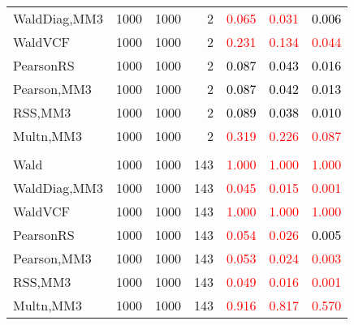 \documentclass[
]{article}
\begin{document}
\begin{table}[H]
{\begin{tabular}[t]{lrrrrrr}
\hspace{1em}WaldDiag,MM3 & 1000 & 1000 & 2 & \textcolor{red}{0.065} & \textcolor{red}{0.031} & \textcolor{black}{0.006}\\
\hspace{1em}WaldVCF & 1000 & 1000 & 2 & \textcolor{red}{0.231} & \textcolor{red}{0.134} & \textcolor{red}{0.044}\\
\hspace{1em}PearsonRS & 1000 & 1000 & 2 & \textcolor{black}{0.087} & \textcolor{black}{0.043} & \textcolor{black}{0.016}\\
\hspace{1em}Pearson,MM3 & 1000 & 1000 & 2 & \textcolor{black}{0.087} & \textcolor{black}{0.042} & \textcolor{black}{0.013}\\
\hspace{1em}RSS,MM3 & 1000 & 1000 & 2 & \textcolor{black}{0.089} & \textcolor{black}{0.038} & \textcolor{black}{0.010}\\
\hspace{1em}Multn,MM3 & 1000 & 1000 & 2 & \textcolor{red}{0.319} & \textcolor{red}{0.226} & \textcolor{red}{0.087}\\
\addlinespace[0.3em]
\multicolumn{7}{l}{\textbf{1F 15V}}\\
\hspace{1em}Wald & 1000 & 1000 & 143 & \textcolor{red}{1.000} & \textcolor{red}{1.000} & \textcolor{red}{1.000}\\
\hspace{1em}WaldDiag,MM3 & 1000 & 1000 & 143 & \textcolor{red}{0.045} & \textcolor{red}{0.015} & \textcolor{red}{0.001}\\
\hspace{1em}WaldVCF & 1000 & 1000 & 143 & \textcolor{red}{1.000} & \textcolor{red}{1.000} & \textcolor{red}{1.000}\\
\hspace{1em}PearsonRS & 1000 & 1000 & 143 & \textcolor{red}{0.054} & \textcolor{red}{0.026} & \textcolor{black}{0.005}\\
\hspace{1em}Pearson,MM3 & 1000 & 1000 & 143 & \textcolor{red}{0.053} & \textcolor{red}{0.024} & \textcolor{red}{0.003}\\
\hspace{1em}RSS,MM3 & 1000 & 1000 & 143 & \textcolor{red}{0.049} & \textcolor{red}{0.016} & \textcolor{red}{0.001}\\
\hspace{1em}Multn,MM3 & 1000 & 1000 & 143 & \textcolor{red}{0.916} & \textcolor{red}{0.817} & \textcolor{red}{0.570}\\

\end{tabular}}
\end{table}
\end{document}

